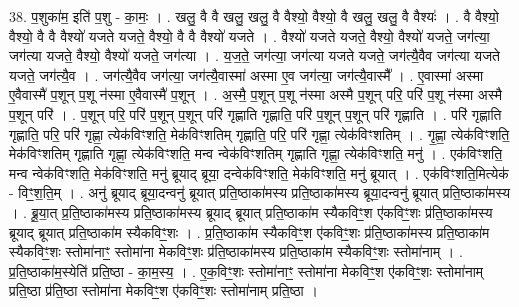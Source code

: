 \documentclass[17pt]{extarticle}
\begin{document}
38. प॒शुका॑म॒ इति॑ प॒शु - का॒मः॒ । . खलु॒ वै वै खलु॒ खलु॒ वै वैश्यो॒ वैश्यो॒ वै खलु॒ खलु॒ वै वैश्यः॑ । . वै वैश्यो॒ वैश्यो॒ वै वै वैश्यो॑ यजते यजते॒ वैश्यो॒ वै वै वैश्यो॑ यजते । . वैश्यो॑ यजते यजते॒ वैश्यो॒ वैश्यो॑ यजते॒ जग॑त्या॒ जग॑त्या यजते॒ वैश्यो॒ वैश्यो॑ यजते॒ जग॑त्या । . य॒ज॒ते॒ जग॑त्या॒ जग॑त्या यजते यजते॒ जग॑त्यै॒वैव जग॑त्या यजते यजते॒ जग॑त्यै॒व । . जग॑त्यै॒वैव जग॑त्या॒ जग॑त्यै॒वास्मा॑ अस्मा ए॒व जग॑त्या॒ जग॑त्यै॒वास्मै᳚ । . ए॒वास्मा॑ अस्मा ए॒वैवास्मै॑ प॒शून् प॒शू न॑स्मा ए॒वैवास्मै॑ प॒शून् । . अ॒स्मै॒ प॒शून् प॒शू न॑स्मा अस्मै प॒शून् परि॒ परि॑ प॒शू न॑स्मा अस्मै प॒शून् परि॑ । . प॒शून् परि॒ परि॑ प॒शून् प॒शून् परि॑ गृह्णाति गृह्णाति॒ परि॑ प॒शून् प॒शून् परि॑ गृह्णाति । . परि॑ गृह्णाति गृह्णाति॒ परि॒ परि॑ गृह्णा॒ त्येक॑विꣳशति॒ मेक॑विꣳशतिम् गृह्णाति॒ परि॒ परि॑ 
गृह्णा॒ त्येक॑विꣳशतिम् । . गृ॒ह्णा॒ त्येक॑विꣳशति॒ मेक॑विꣳशतिम् गृह्णाति गृह्णा॒ त्येक॑विꣳशति॒ मन्व न्वेक॑विꣳशतिम् गृह्णाति गृह्णा॒ त्येक॑विꣳशति॒ मनु॑ । . एक॑विꣳशति॒ मन्व न्वेक॑विꣳशति॒ मेक॑विꣳशति॒ मनु॑ ब्रूयाद् ब्रूया॒ दन्वेक॑विꣳशति॒ मेक॑विꣳशति॒ मनु॑ ब्रूयात् । . एक॑विꣳशति॒मित्येक॑ - विꣳ॒॒श॒ति॒म् । . अनु॑ ब्रूयाद् ब्रूया॒दन्वनु॑ ब्रूयात् प्रति॒ष्ठाका॑मस्य प्रति॒ष्ठाका॑मस्य ब्रूया॒दन्वनु॑ ब्रूयात् प्रति॒ष्ठाका॑मस्य । . ब्रू॒या॒त् प्र॒ति॒ष्ठाका॑मस्य प्रति॒ष्ठाका॑मस्य ब्रूयाद् ब्रूयात् प्रति॒ष्ठाका॑म स्यैकविꣳ॒॒श ए॑कविꣳ॒॒शः प्र॑ति॒ष्ठाका॑मस्य ब्रूयाद् ब्रूयात् प्रति॒ष्ठाका॑म स्यैकविꣳ॒॒शः । . प्र॒ति॒ष्ठाका॑म स्यैकविꣳ॒॒श ए॑कविꣳ॒॒शः प्र॑ति॒ष्ठाका॑मस्य प्रति॒ष्ठाका॑म स्यैकविꣳ॒॒शः स्तोमा॑नाꣳ॒॒ स्तोमा॑ना मेकविꣳ॒॒शः प्र॑ति॒ष्ठाका॑मस्य प्रति॒ष्ठाका॑म स्यैकविꣳ॒॒शः स्तोमा॑नाम् । . प्र॒ति॒ष्ठाका॑म॒स्येति॑ प्रति॒ष्ठा - का॒म॒स्य॒ । . ए॒क॒विꣳ॒॒शः स्तोमा॑नाꣳ॒॒ स्तोमा॑ना मेकविꣳ॒॒श ए॑कविꣳ॒॒शः स्तोमा॑नाम् प्रति॒ष्ठा प्र॑ति॒ष्ठा स्तोमा॑ना मेकविꣳ॒॒श ए॑कविꣳ॒॒शः स्तोमा॑नाम् प्रति॒ष्ठा । \newline
\end{document}
